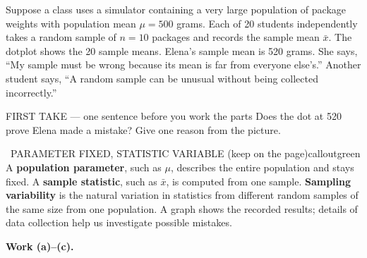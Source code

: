 \documentclass[11pt]{article}
\begin{document}


Suppose a class uses a simulator containing a very large population of package weights with population mean $\mu=500$ grams. Each of 20 students independently takes a random sample of $n=10$ packages and records the sample mean $\bar{x}$. The dotplot shows the 20 sample means. Elena's sample mean is 520 grams. She says, ``My sample must be wrong because its mean is far from everyone else's.'' Another student says, ``A random sample can be unusual without being collected incorrectly.''\par
\begin{center}
\end{center}
\begin{firsttakebox}{FIRST TAKE --- one sentence before you work the parts}
Does the dot at 520 prove Elena made a mistake? Give one reason from the picture.
\workspace{0.9in}
\end{firsttakebox}

\begin{callout}{\IconBook\ PARAMETER FIXED, STATISTIC VARIABLE (keep on the page)}{calloutgreen}
A \textbf{population parameter}, such as $\mu$, describes the entire population and stays fixed.
A \textbf{sample statistic}, such as $\bar{x}$, is computed from one sample.
\textbf{Sampling variability} is the natural variation in statistics from different random samples of the same size from one population.
A graph shows the recorded results; details of data collection help us investigate possible mistakes.
\end{callout}

\newpage
\textbf{Work (a)--(c).}\par\smallskip
\end{document}

